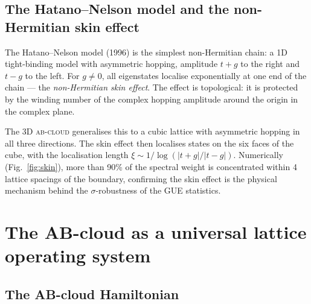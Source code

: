 \documentclass[11pt,a4paper]{article}
\theoremstyle{plain}
\theoremstyle{definition}
\theoremstyle{remark}
\newcommand{\Abcloud}{\textsc{ab-cloud}}
\begin{document}
\subsection{The Hatano--Nelson model and the non-Hermitian skin effect}

The Hatano--Nelson model (1996) is the simplest non-Hermitian chain: a 1D tight-binding model with asymmetric hopping, amplitude $t+g$ to the right and $t-g$ to the left. For $g\ne 0$, all eigenstates localise exponentially at one end of the chain — the \emph{non-Hermitian skin effect}. The effect is topological: it is protected by the winding number of the complex hopping amplitude around the origin in the complex plane.

The 3D \Abcloud{} generalises this to a cubic lattice with asymmetric hopping in all three directions. The skin effect then localises states on the six faces of the cube, with the localisation length $\xi \sim 1/\log(|t+g|/|t-g|)$. Numerically (Fig.~\ref{fig:skin}), more than 90\% of the spectral weight is concentrated within 4 lattice spacings of the boundary, confirming the skin effect is the physical mechanism behind the $\sigma$-robustness of the GUE statistics.

\section{The AB-cloud as a universal lattice operating system}\label{sec:OS}

\subsection{The AB-cloud Hamiltonian}
\end{document}

